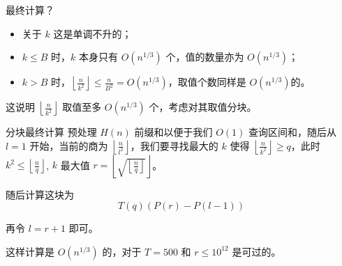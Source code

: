 \documentclass{beamer}
\begin{document}
{\begin{frame}{最终计算？}
\begin{itemize}
  \item 关于 $k$ 这是单调不升的；
  \item $k \le B$ 时，$k$ 本身只有 $O(n^{1/3})$ 个，值的数量亦为 $O(n^{1/3})$；
  \item $k > B$ 时，$\left\lfloor\frac {n}{k^2}\right\rfloor \le \frac{n}{B^2} = O(n^{1/3})$，取值个数同样是 $O(n^{1/3})$的。
\end{itemize}

这说明 $\left\lfloor\frac {n}{k^2}\right\rfloor$ 取值至多 $O(n^{1/3})$ 个，考虑对其取值分块。

\end{frame}
\begin{frame}{分块最终计算}
  预处理 $H(n)$ 前缀和以便于我们 $O(1)$ 查询区间和，随后从 $l = 1$ 开始，当前的商为 $\left\lfloor\frac {n}{l^2}\right\rfloor$，我们要寻找最大的 $k$ 使得 $\left\lfloor\frac {n}{k^2}\right\rfloor \ge q$，此时 $k^2 \le \left\lfloor\frac {n}{q}\right\rfloor$, $k$ 最大值 $r = \left\lfloor\sqrt{\left\lfloor\frac {n}{q}\right\rfloor}\right\rfloor$。

  随后计算这块为 \[
      T(q) \left( P(r)-P(l-1) \right)
  \]

  再令 $l = r + 1$ 即可。

  这样计算是 $O(n^{1/3})$ 的，对于 $T = 500$ 和 $r \le 10^{12}$ 是可过的。

\end{frame}
}
\end{document}
